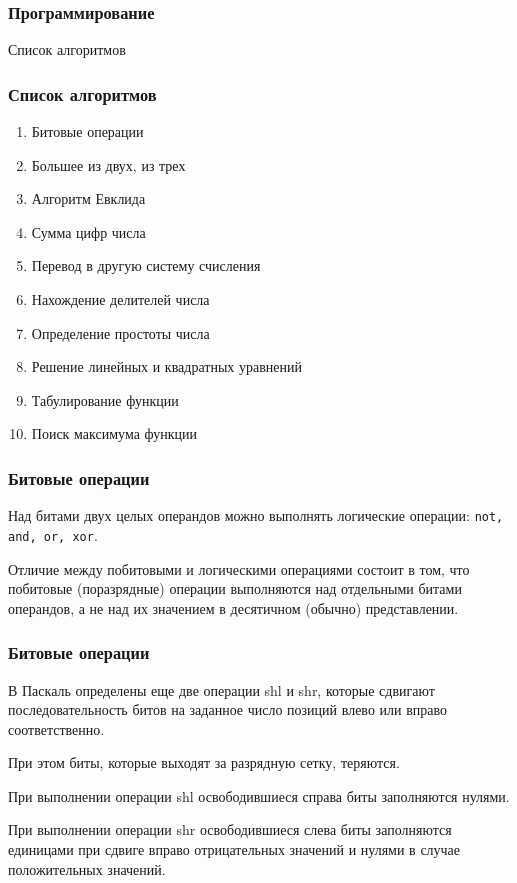 \subtitle{Лекция 10 --- Программирование: Числовые алгоритмы}

\frame[plain]
{\titlepage}	%


\begin{frame}
\frametitle{Программирование}

\begin{center}

\Huge
Список алгоритмов	
\end{center}
\end{frame}

	\begin{frame}
\frametitle{Список алгоритмов}
\begin{enumerate}
	\item Битовые операции
	\item Большее из двух, из трех
	\item Алгоритм Евклида
	\item Сумма цифр числа
	\item Перевод в другую систему счисления
	\item Нахождение делителей числа
	\item Определение простоты числа
	\item Решение линейных и квадратных уравнений
	\item Табулирование функции
	\item Поиск максимума функции
\end{enumerate}
\end{frame}

	


	\begin{frame}
\frametitle{Битовые операции}

Над битами двух целых операндов можно выполнять логические операции: \texttt{not, and, or, xor}. 

Отличие между побитовыми и логическими операциями состоит в том, что побитовые (поразрядные) операции выполняются над отдельными битами операндов, а не над их значением в десятичном (обычно) представлении.

\end{frame}

	\begin{frame}
\frametitle{Битовые операции}

В Паскаль определены еще две операции shl и shr, которые сдвигают последовательность битов на заданное число позиций влево или вправо соответственно. 

При этом биты, которые выходят за разрядную сетку, теряются. 

При выполнении операции shl освободившиеся справа биты заполняются нулями. 

При выполнении операции shr освободившиеся слева биты заполняются единицами при сдвиге вправо отрицательных значений и нулями в случае положительных значений.

\end{frame}

